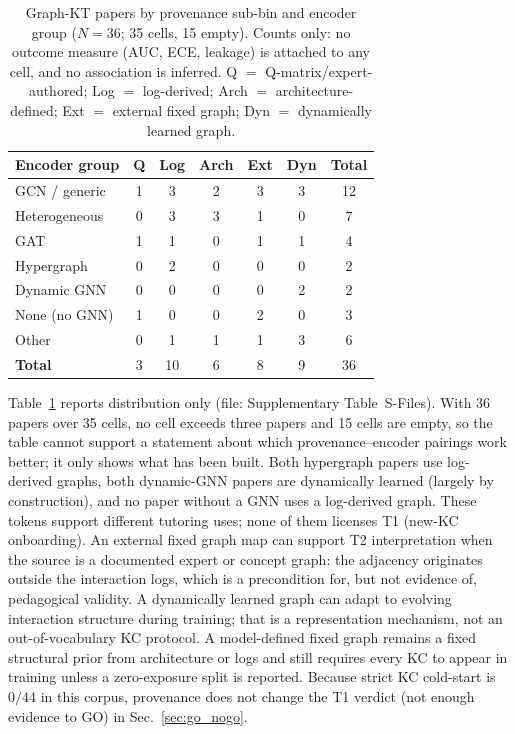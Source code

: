 \documentclass[lettersize,journal]{IEEEtran}
\begin{document}
\begin{table}[t]
\caption{Graph-KT papers by provenance sub-bin and encoder group ($N=36$; 35 cells, 15 empty). Counts only: no outcome measure (AUC, ECE, leakage) is attached to any cell, and no association is inferred. Q $=$ Q-matrix/expert-authored; Log $=$ log-derived; Arch $=$ architecture-defined; Ext $=$ external fixed graph; Dyn $=$ dynamically learned graph.}
\label{tab:prov_encoder}
\centering
\footnotesize
\setlength{\tabcolsep}{4pt}
\begin{tabular}{@{}lccccc|c@{}}
\toprule
\textbf{Encoder group} & \textbf{Q} & \textbf{Log} & \textbf{Arch} & \textbf{Ext} & \textbf{Dyn} & \textbf{Total} \\
\midrule
GCN / generic & 1 & 3 & 2 & 3 & 3 & 12 \\
Heterogeneous & 0 & 3 & 3 & 1 & 0 & 7 \\
GAT & 1 & 1 & 0 & 1 & 1 & 4 \\
Hypergraph & 0 & 2 & 0 & 0 & 0 & 2 \\
Dynamic GNN & 0 & 0 & 0 & 0 & 2 & 2 \\
None (no GNN) & 1 & 0 & 0 & 2 & 0 & 3 \\
Other & 0 & 1 & 1 & 1 & 3 & 6 \\
\midrule
\textbf{Total} & 3 & 10 & 6 & 8 & 9 & 36 \\
\bottomrule
\end{tabular}
\end{table}
Table~\ref{tab:prov_encoder} reports distribution only (file: Supplementary Table~S-Files). With 36 papers over 35 cells, no cell exceeds three papers and 15 cells are empty, so the table cannot support a statement about which provenance--encoder pairings work better; it only shows what has been built. Both hypergraph papers use log-derived graphs, both dynamic-GNN papers are dynamically learned (largely by construction), and no paper without a GNN uses a log-derived graph.
These tokens support different tutoring uses; none of them licenses T1 (new-KC onboarding). An external fixed graph map can support T2 interpretation when the source is a documented expert or concept graph: the adjacency originates outside the interaction logs, which is a precondition for, but not evidence of, pedagogical validity. A dynamically learned graph can adapt to evolving interaction structure during training; that is a representation mechanism, not an out-of-vocabulary KC protocol. A model-defined fixed graph remains a fixed structural prior from architecture or logs and still requires every KC to appear in training unless a zero-exposure split is reported. Because strict KC cold-start is $0/44$ in this corpus, provenance does not change the T1 verdict (not enough evidence to GO) in Sec.~\ref{sec:go_nogo}.
\end{document}
